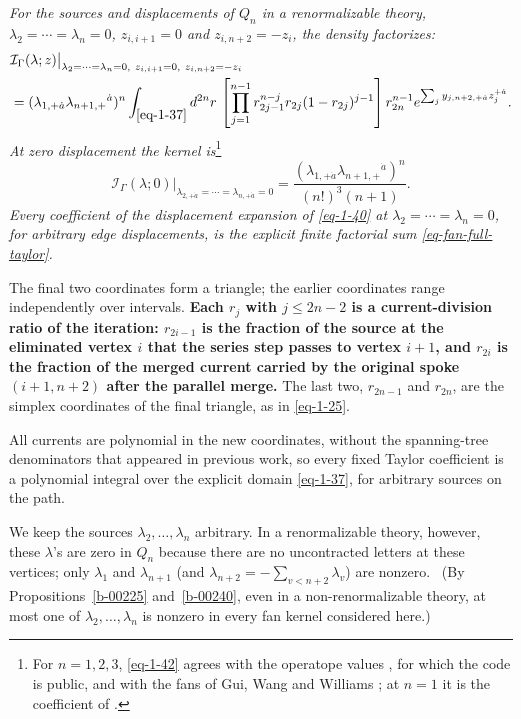 \documentclass[11pt]{article}
\numberwithin{equation}{section}
\numberwithin{figure}{section}
\numberwithin{table}{section}
\begin{document}
\emph{For the sources and displacements of $Q_n$ in a renormalizable theory, $\lambda_2=\cdots=\lambda_n=0$, $z_{i,i+1}=0$ and $z_{i,n+2}=-z_i$, the density factorizes:}
\begin{equation}\label{eq-1-41}
\begin{aligned}
&\mathcal I_\Gamma(\lambda;z)
\big|_{\lambda_2=\cdots=\lambda_n=0,
\ z_{i,i+1}=0,\ z_{i,n+2}=-z_i}\\
&=(\lambda_{1,+\dot a}\lambda_{n+1,+}{}^{\dot a})^n
\int_{\eqref{eq-1-37}}d^{2n}r\,
\left[\prod_{j=1}^{n-1}r_{2j-1}^{n-j}r_{2j}(1-r_{2j})^{j-1}\right]
r_{2n}^{n-1}
e^{\sum_j y_{j,n+2,+\dot a}z_j^{+\dot a}}.
\end{aligned}
\end{equation}
\emph{At zero displacement the kernel is}\footnote{For $n=1,2,3$, \eqref{eq-1-42} agrees with the operatope values \cite[Equations (4.20), (4.44), (4.67)]{operatope}, for which the code \cite{LamanLoopstrap} is public, and with the fans of Gui, Wang and Williams \cite[Sections 4.4--4.6]{GWW}; at $n=1$ it is the coefficient of \cite[Equation (2.48)]{BK}.}
\begin{equation}\label{eq-1-42}
\left.\mathcal I_\Gamma(\lambda;0)\right|_{\lambda_{2,+\dot a}=\cdots=\lambda_{n,+\dot a}=0}
=\frac{(\lambda_{1,+\dot a}\lambda_{n+1,+}{}^{\dot a})^n}{(n!)^3(n+1)}.
\end{equation}
\emph{Every coefficient of the displacement expansion of \eqref{eq-1-40} at $\lambda_2=\cdots=\lambda_n=0$, for arbitrary edge displacements, is the explicit finite factorial sum \eqref{eq-fan-full-taylor}.}

The final two coordinates form a triangle; the earlier coordinates range independently over intervals. \textbf{Each $r_j$ with $j\le2n-2$ is a current-division ratio of the iteration: $r_{2i-1}$ is the fraction of the source at the eliminated vertex $i$ that the series step passes to vertex $i+1$, and $r_{2i}$ is the fraction of the merged current carried by the original spoke $(i+1,n+2)$ after the parallel merge.} The last two, $r_{2n-1}$ and $r_{2n}$, are the simplex coordinates of the final triangle, as in \eqref{eq-1-25}.

All currents are polynomial in the new coordinates, without the spanning-tree denominators that appeared in previous work, so every fixed Taylor coefficient is a polynomial integral over the explicit domain \eqref{eq-1-37}, for arbitrary sources on the path.

We keep the sources $\lambda_2,\ldots,\lambda_n$ arbitrary. In a renormalizable theory, however, these $\lambda$'s are zero in $Q_n$ because there are no uncontracted letters at these vertices; only $\lambda_1$ and $\lambda_{n+1}$ (and $\lambda_{n+2}=-\sum_{v<n+2}\lambda_v$) are nonzero.~ (By Propositions~\ref{b-00225} and~\ref{b-00240}, even in a non-renormalizable theory, at most one of $\lambda_2,\ldots,\lambda_n$ is nonzero in every fan kernel considered here.)
\end{document}
